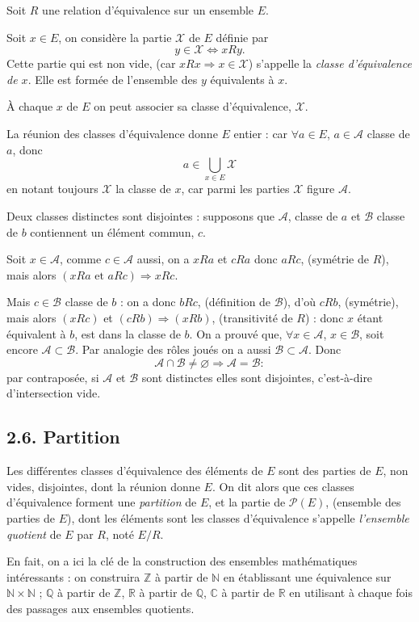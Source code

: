 Soit $R$ une relation d'équivalence sur un ensemble $E$.

Soit $x\in E$, on considère la partie $\mathcal X$ de $E$ définie par
\[
y\in\mathcal X\Leftrightarrow xRy.
\]
Cette partie qui est non vide, (car $xRx\Rightarrow x\in\mathcal X$) s'appelle la \emph{classe d'équivalence de $x$}. Elle est formée de l'ensemble des $y$ équivalents à $x$.

À chaque $x$ de $E$ on peut associer sa classe d'équivalence, $\mathcal X$.

La réunion des classes d'équivalence donne $E$ entier : car $\forall a\in E$, $a\in\mathcal A$ classe de $a$, donc
\[
a\in\bigcup_{x\in E}\mathcal X
\]
en notant toujours $\mathcal X$ la classe de $x$, car parmi les parties $\mathcal X$ figure $\mathcal A$. \bookend

Deux classes distinctes sont disjointes : supposons que $\mathcal A$, classe de $a$ et $\mathcal B$ classe de $b$ contiennent un élément commun, $c$.

Soit $x\in\mathcal A$, comme $c\in\mathcal A$ aussi, on a $xRa$ et $cRa$ donc $aRc$, (symétrie de $R$), mais alors $(xRa\text{ et }aRc)\Rightarrow xRc$.

Mais $c\in\mathcal B$ classe de $b$ : on a donc $bRc$, (définition de $\mathcal B$), d'où $cRb$, (symétrie), mais alors $(xRc)$ et $(cRb)\Rightarrow(xRb)$, (transitivité de $R$) : donc $x$ étant équivalent à $b$, est dans la classe de $b$. On a prouvé que, $\forall x\in\mathcal A$, $x\in\mathcal B$, soit encore $\mathcal A\subset\mathcal B$. Par analogie des rôles joués on a aussi $\mathcal B\subset\mathcal A$. Donc
\[
\mathcal A\cap\mathcal B\ne\varnothing\Rightarrow\mathcal A=\mathcal B :
\]
par contraposée, si $\mathcal A$ et $\mathcal B$ sont distinctes elles sont disjointes, c'est-à-dire d'intersection vide.

\subsection*{2.6. Partition}

Les différentes classes d'équivalence des éléments de $E$ sont des parties de $E$, non vides, disjointes, dont la réunion donne $E$. On dit alors que ces classes d'équivalence forment une \emph{partition} de $E$, et la partie de $\mathcal P(E)$, (ensemble des parties de $E$), dont les éléments sont les classes d'équivalence s'appelle \emph{l'ensemble quotient} de $E$ par $R$, noté $E/R$.

En fait, on a ici la clé de la construction des ensembles mathématiques intéressants : on construira $\mathbb Z$ à partir de $\mathbb N$ en établissant une équivalence sur $\mathbb N\times\mathbb N$ ; $\mathbb Q$ à partir de $\mathbb Z$, $\mathbb R$ à partir de $\mathbb Q$, $\mathbb C$ à partir de $\mathbb R$ en utilisant à chaque fois des passages aux ensembles quotients.

